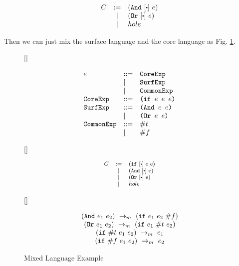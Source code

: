 \[
\begin{array}{lcl}
C &:=& (\m{And}~[\bigcdot]~e)\\
&|& (\m{Or}~[\bigcdot]~e)\\
&|&hole\\
\end{array}
\]

Then we can just mix the surface language and the core language as Fig. \ref{fig:mixexample}. 

\begin{figure}[thb]
\centering
{}[\linewidth]{\footnotesize
\begin{flushleft}
\[
\begin{array}{lll}
e &::=& \mbox{\tt CoreExp} \\
&|&\mbox{\tt SurfExp}\\
&|&\mbox{\tt CommonExp}\\
\mbox{\tt CoreExp} &::=& \texttt{(if~$e$~$e$~$e$)}\\
\mbox{\tt SurfExp} &::=& \texttt{(And~$e$~$e$)}\\
&|&\texttt{(Or~$e$~$e$)}\\
\mbox{\tt CommonExp} &::=& \#t\\
&|& \#f\\
\end{array}
\]
\end{flushleft}

}
[\linewidth]{
\begin{flushleft}
\[\footnotesize
\begin{array}{lcl}
C &:=& (\m{if}~[\bigcdot]~$e$~$e$)\\
&|& (\m{And}~[\bigcdot]~$e$)\\
&|& (\m{Or}~[\bigcdot]~$e$)\\
&|&hole\\
\end{array}
\]
\end{flushleft}

}

[\linewidth]{\footnotesize
\begin{flushleft}
\[
\begin{array}{c}
(\mbox{\tt And}~e_1~e_2) ~\rightarrow_m~(\mbox{\tt if}~e_1~e_2~\#f)\\
(\mbox{\tt Or}~e_1~e_2) ~\rightarrow_m~(\mbox{\tt if}~e_1~\#t~e_2)\\
(\mbox{\tt if}~\#t~e_1~e_2) ~\rightarrow_m~e_1\\
(\mbox{\tt if}~\#f~e_1~e_2) ~\rightarrow_m~e_2 
\end{array}
\]
\end{flushleft}

}

\caption{Mixed Language Example}
\label{fig:mixexample}
\end{figure}

